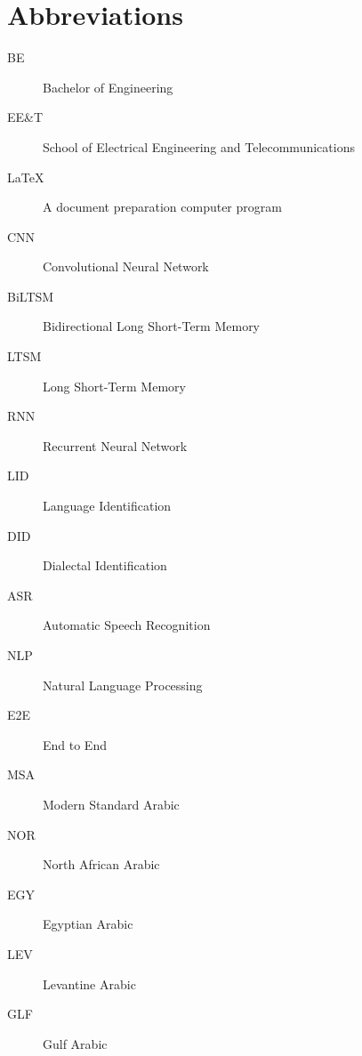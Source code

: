 \chapter*{Abbreviations}\label{abbr}
\begin{description}
\item[BE] Bachelor of Engineering
\item[EE\&T] School of Electrical Engineering and Telecommunications
\item[\LaTeX] A document preparation computer program
\item[CNN] Convolutional Neural Network
\item[BiLTSM] Bidirectional Long Short-Term Memory
\item[LTSM] Long Short-Term Memory
\item[RNN] Recurrent Neural Network
\item[LID] Language Identification
\item[DID] Dialectal Identification  
\item[ASR] Automatic Speech Recognition
\item[NLP] Natural Language Processing 
\item[E2E] End to End
\item[MSA] Modern Standard Arabic 
\item[NOR] North African Arabic
\item[EGY] Egyptian Arabic
\item[LEV] Levantine Arabic 
\item[GLF] Gulf Arabic  
\end{description}
